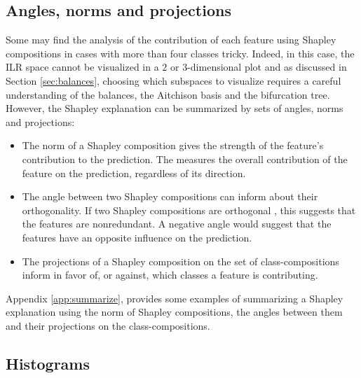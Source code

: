 \documentclass{article}
\theoremstyle{plain}
\theoremstyle{definition}
\theoremstyle{remark}
\begin{document}
\subsection{Angles, norms and projections}

Some may find the analysis of the contribution of each feature using Shapley compositions in cases with more than four classes tricky. Indeed, in this case, the ILR space cannot be visualized in a $2$ or $3$-dimensional plot and as discussed in Section \ref{sec:balances}, choosing which subspaces to visualize requires a careful understanding of the balances, the Aitchison basis and the bifurcation tree. However, the Shapley explanation can be summarized by sets of angles, norms and projections:
\begin{itemize}
\item The norm of a Shapley composition gives the strength of the feature's contribution to the prediction. The measures the overall contribution of the feature on the prediction, regardless of its direction.
\item The angle between two Shapley compositions can inform about their orthogonality. If two Shapley compositions are orthogonal%
, this suggests that the features are nonredundant. A negative angle would suggest that the features have an opposite influence on the prediction.
\item The projections of a Shapley composition on the set of class-compositions inform in favor of, or against, which classes a feature is contributing.
\end{itemize}

  Appendix \ref{app:summarize}, provides some examples of summarizing a Shapley explanation using the norm of Shapley compositions, the angles between them and their projections on the class-compositions.

\subsection{Histograms}
\end{document}
